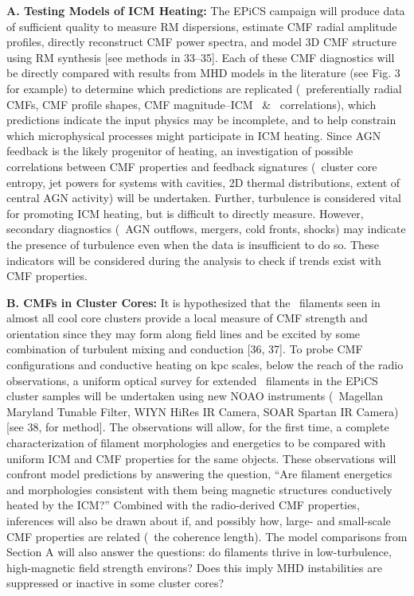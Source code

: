 \documentclass[letterpaper,12pt]{article}
\begin{document}
{\bf{A. Testing Models of ICM Heating:}} The EPiCS campaign will
produce data of sufficient quality to measure RM dispersions, estimate
CMF radial amplitude profiles, directly reconstruct CMF power spectra,
and model 3D CMF structure using RM synthesis [see methods in
  33--35]. Each of these CMF diagnostics will be directly compared
with results from MHD models in the literature (see Fig. 3 for
example) to determine which predictions are replicated
(\eg\ preferentially radial CMFs, CMF profile shapes, CMF
magnitude--ICM \nelec\ \& \tx\ correlations), which predictions
indicate the input physics may be incomplete, and to help constrain
which microphysical processes might participate in ICM heating. Since
AGN feedback is the likely progenitor of heating, an investigation of
possible correlations between CMF properties and feedback signatures
(\eg\ cluster core entropy, jet powers for systems with cavities, 2D
thermal distributions, extent of central AGN activity) will be
undertaken. Further, turbulence is considered vital for promoting ICM
heating, but is difficult to directly measure. However, secondary
diagnostics (\eg\ AGN outflows, mergers, cold fronts, shocks) may
indicate the presence of turbulence even when the data is insufficient
to do so. These indicators will be considered during the analysis to
check if trends exist with CMF properties.

{\bf{B. CMFs in Cluster Cores:}} It is hypothesized that the
\halpha\ filaments seen in almost all cool core clusters provide a
local measure of CMF strength and orientation since they may form
along field lines and be excited by some combination of turbulent
mixing and conduction [36, 37]. To probe CMF configurations and
conductive heating on kpc scales, below the reach of the radio
observations, a uniform optical survey for extended \halpha\ filaments
in the EPiCS cluster samples will be undertaken using new NOAO
instruments (\ie\ Magellan Maryland Tunable Filter, WIYN HiRes IR
Camera, SOAR Spartan IR Camera) [see 38, for method]. The observations
will allow, for the first time, a complete characterization of
filament morphologies and energetics to be compared with uniform ICM
and CMF properties for the same objects. These observations will
confront model predictions by answering the question, ``Are filament
energetics and morphologies consistent with them being magnetic
structures conductively heated by the ICM?''  Combined with the
radio-derived CMF properties, inferences will also be drawn about if,
and possibly how, large- and small-scale CMF properties are related
(\eg\ the coherence length). The model comparisons from Section A will
also answer the questions: do filaments thrive in low-turbulence,
high-magnetic field strength environs? Does this imply MHD
instabilities are suppressed or inactive in some cluster cores?
\end{document}

